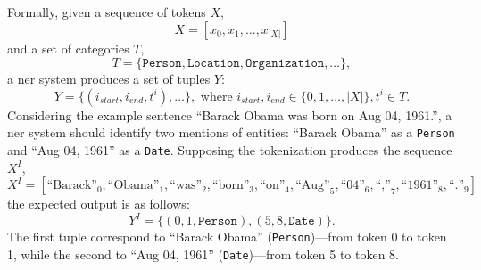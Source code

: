 Formally, given a sequence of tokens $X$,
\begin{equation}
    X = [x_0, x_1, \ldots, x_{|X|}]
\end{equation}
and a set of categories $T$,
\begin{equation}
T = \{\texttt{Person}, \texttt{Location}, \texttt{Organization}, \ldots\},
\end{equation}
a \ac{ner} system produces a set of tuples $Y$:
\begin{equation}
Y = \{(i_{start},i_{end},t^i),\ldots\}, \text{ where } i_{start}, i_{end} \in \{0,1,\ldots,|X|\}, t^i \in T.
\end{equation}
Considering the example sentence ``Barack Obama was born on Aug 04, 1961.'', a \ac{ner} system should identify two mentions of entities: ``Barack Obama'' as a \texttt{Person} and ``Aug 04, 1961'' as a \texttt{Date}. Supposing the tokenization produces the sequence $X^I$,
\begin{equation}
X^I = [\text{``Barack''}_0, \text{``Obama''}_1, \text{``was''}_2, \text{``born''}_3, 
       \text{``on''}_4, \text{``Aug''}_5, \text{``04''}_6, \text{``,''}_7, 
       \text{``1961''}_8, \text{``.''}_9]
\end{equation}
the expected output is as follows:
\begin{equation}
Y^I = \{(0, 1, \texttt{Person}), (5, 8, \texttt{Date})\}.
\end{equation}
The first tuple correspond to ``Barack Obama'' (\texttt{Person})---from token 0 to token 1, while the second to ``Aug 04, 1961'' (\texttt{Date})---from token 5 to token 8.

